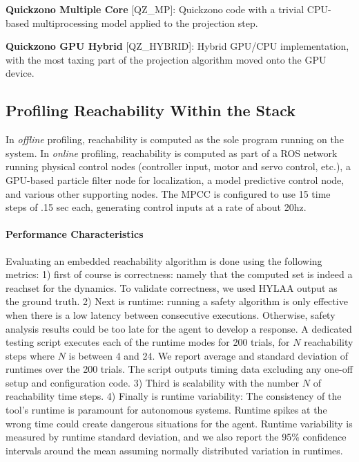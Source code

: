 \documentclass[runningheads]{llncs}
\begin{document}
\textbf{Quickzono Multiple Core} [QZ\_MP]: Quickzono code with a trivial CPU-based multiprocessing model \newline applied to the projection step. 

\textbf{Quickzono GPU Hybrid} [QZ\_HYBRID]: Hybrid GPU/CPU implementation, with the most taxing part of the projection algorithm moved onto the GPU device. 


\subsection{Profiling Reachability Within the Stack}

In \textit{offline} profiling, reachability is computed as the sole program running on the system. 
In \textit{online} profiling, reachability is computed as part of a ROS network running physical control nodes (controller input, motor and servo control, etc.), a GPU-based particle filter node for localization, a model predictive control node, and various other supporting nodes. The MPCC is configured to use 15 time steps of .15 sec each, generating control inputs at a rate of about 20hz.

\paragraph{Performance Characteristics}
Evaluating an embedded reachability algorithm is done using the following metrics: 
1) first of course is correctness: namely that the computed set is indeed a reachset for the dynamics. To validate correctness, we used HYLAA output as the ground truth.
%
2) Next is runtime: running a safety algorithm is only effective when there is a low latency between consecutive executions. Otherwise, safety analysis results could be too late for the agent to develop a response. 
A dedicated testing script executes each of the runtime modes for 200 trials, for $N$ reachability steps where $N$ is between 4 and 24. 
We report average and standard deviation of runtimes over the 200 trials.
The script outputs timing data excluding any one-off setup and configuration code.
%
3) Third is scalability with the number $N$ of reachability time steps. 
%
4) Finally is runtime variability: The consistency of the tool's runtime is paramount for autonomous systems.
Runtime spikes at the wrong time could create dangerous situations for the agent. 
Runtime variability is measured by runtime standard deviation, and we also report the  95\% confidence intervals around the mean assuming normally distributed variation in runtimes.
\end{document}
